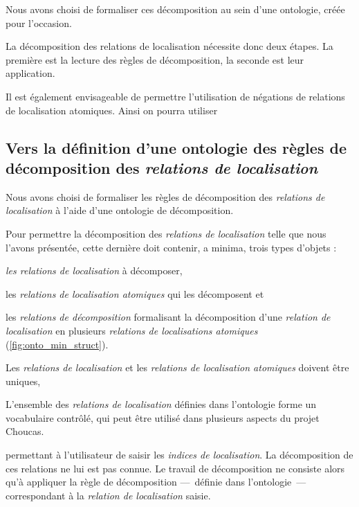 Nous avons choisi de formaliser ces décomposition
au sein d'une ontologie, créée pour l'occasion.

La décomposition des relations de localisation nécessite donc deux
étapes. La première est la lecture des règles de décomposition, la
seconde est leur application.



Il est également envisageable de permettre l'utilisation de négations
de relations de localisation atomiques. Ainsi on pourra utiliser



\subsection{Vers la définition d'une ontologie des règles de
  décomposition des \emph{relations de localisation}}

Nous avons choisi de formaliser les règles de décomposition des
\emph{relations de localisation} à l'aide d'une ontologie de
décomposition.

Pour permettre la décomposition des \emph{relations de localisation}
telle que nous l'avons présentée, cette dernière doit contenir, a
minima, trois types d'objets :
%
\begin{enumerate*}[label=(\alph*)]
\item \emph{les relations de localisation} à décomposer,
\item les \emph{relations de localisation atomiques} qui les
  décomposent et
\item les \emph{relations de décomposition} formalisant la
  décomposition d'une \emph{relation de localisation} en plusieurs
  \emph{relations de localisations atomiques}
  (\autoref{fig:onto_min_struct}).
\end{enumerate*}
%
Les \emph{relations de localisation} et les \emph{relations de
  localisation atomiques} doivent être uniques, 

L'ensemble des \emph{relations de localisation} définies dans
l'ontologie forme un vocabulaire contrôlé, qui peut être utilisé dans
plusieurs aspects du projet Choucas. 



permettant à l'utilisateur
de saisir les \emph{indices de localisation}. La décomposition de ces
relations ne lui est pas connue. Le travail de décomposition ne
consiste alors qu'à appliquer la règle de décomposition ---~définie
dans l'ontologie~--- correspondant à la \emph{relation de
  localisation} saisie.

